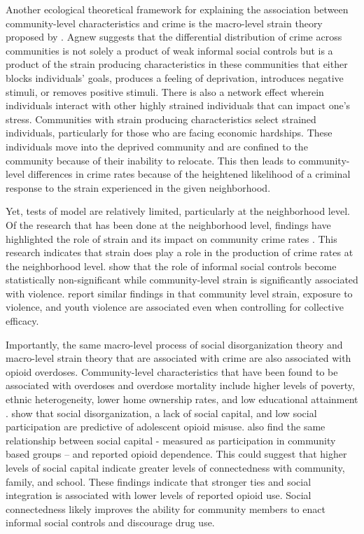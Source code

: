 Another ecological theoretical framework for explaining the association between community-level characteristics and crime is the macro-level strain theory proposed by \parencite{agnew_robert_general_1999}. Agnew suggests that the differential distribution of crime across communities is not solely a product of weak informal social controls but is a product of the strain producing characteristics in these communities that either blocks individuals’ goals, produces a feeling of deprivation, introduces negative stimuli, or removes positive stimuli. There is also a network effect wherein individuals interact with other highly strained individuals that can impact one’s stress. Communities with strain producing characteristics select strained individuals, particularly for those who are facing economic hardships. These individuals move into the deprived community and are confined to the community because of their inability to relocate. This then leads to community-level differences in crime rates because of the heightened likelihood of a criminal response to the strain experienced in the given neighborhood.

Yet, tests of \textcite{agnew_robert_general_1999} model are relatively limited, particularly at the neighborhood level. Of the research that has been done at the neighborhood level, findings have highlighted the role of strain and its impact on community crime rates \parencite{antunes_social_2022, warner_strain_2003}. This research indicates that strain does play a role in the production of crime rates at the neighborhood level. \textcite{warner_strain_2003} show that the role of informal social controls become statistically non-significant while community-level strain is significantly associated with violence. \textcite{antunes_social_2022} report similar findings in that community level strain, exposure to violence, and youth violence are associated even when controlling for collective efficacy. 

Importantly, the same macro-level process of social disorganization theory and macro-level strain theory that are associated with crime are also associated with opioid overdoses. Community-level characteristics that have been found to be associated with overdoses and overdose mortality include higher levels of poverty, ethnic heterogeneity, lower home ownership rates, and low educational attainment \parencite{chichester_pharmacies_2020, galea_income_2003, hannon_neighborhood_2006, ford_neighborhood_2017}. \textcite{ford_neighborhood_2017} show that social disorganization, a lack of social capital, and low social participation are predictive of adolescent opioid misuse. \textcite{winstanley_association_2008} also find the same relationship between social capital - measured as participation in community based groups -- and reported opioid dependence. This could suggest that higher levels of social capital indicate greater levels of connectedness with community, family, and school. These findings indicate that stronger ties and social integration is associated with lower levels of reported opioid use. Social connectedness likely improves the ability for community members to enact informal social controls and discourage drug use. 

